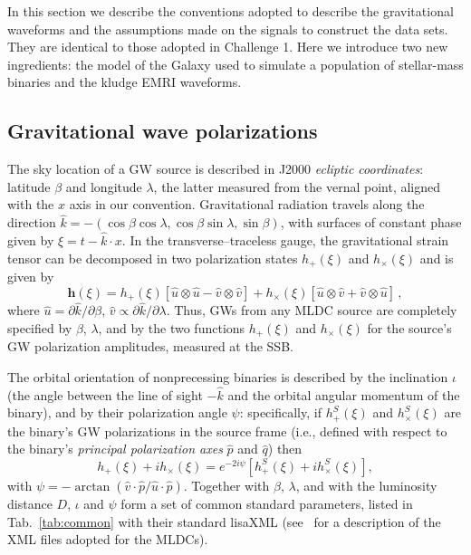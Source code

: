 \documentclass[12pt]{iopart}
\begin{document}
In this section we describe the conventions adopted to describe the gravitational waveforms and the assumptions made on the signals to construct the data sets. They are identical to those adopted in Challenge 1. Here we introduce two new ingredients: the model of the Galaxy used to simulate a population of stellar-mass binaries and the kludge EMRI waveforms.

\subsection{Gravitational wave polarizations}
\label{ss:polarizations}

The sky location of a GW source is described in J2000 \emph{ecliptic coordinates}: latitude $\beta$ and longitude $\lambda$, the latter measured from the vernal point, aligned with the $\hat{x}$ axis in our convention. Gravitational radiation travels along the direction $\hat{k} = -(\cos \beta \cos \lambda, \cos \beta \sin \lambda, \sin \beta)$, with surfaces of constant phase given by $\xi = t - \hat{k} \cdot x$. In the transverse--traceless gauge, the gravitational strain tensor can be decomposed in two polarization states $h_{+}(\xi)$ and $h_{\times}(\xi)$ and is given by
%
\begin{equation}
\label{eq:defpol}
\mathbf{h}(\xi) = h_{+}(\xi) \left[ \hat{u}\otimes \hat{u} - \hat{v}\otimes \hat{v} \right] + h_{\times}(\xi) \left[ \hat{u}\otimes \hat{v} + \hat{v}\otimes \hat{u} \right]\,,
\end{equation}
%
where $\hat{u} = \partial \hat{k} / \partial{\beta}$, $\hat{v} \propto \partial \hat{k} / \partial{\lambda}$. Thus, GWs from any MLDC source are completely specified by $\beta$, $\lambda$, and by the two functions $h_+(\xi)$ and $h_\times(\xi)$ for the source's GW polarization amplitudes, measured at the SSB.

The orbital orientation of nonprecessing binaries is described by the inclination $\iota$ (the angle between the line of sight $-\hat{k}$ and the orbital angular momentum of the binary), and by their polarization angle $\psi$: specifically, if $h^S_{+}(\xi)$ and $h^S_\times(\xi)$ are the binary's GW polarizations in the source frame (i.e., defined with respect to the binary's \emph{principal polarization axes} $\hat{p}$ and $\hat{q}$) then 
%
\begin{equation}
h_+(\xi) + i h_\times(\xi) = e^{-2 i \psi} \left[ h^S_+(\xi) + i h^S_\times(\xi) \right],
\end{equation}
%
with $\psi = -\arctan(\hat{v} \cdot \hat{p} / \hat{u} \cdot \hat{p})$.
Together with $\beta$, $\lambda$, and with the luminosity distance $D$, $\iota$ and $\psi$ form a set of common standard parameters, listed in Tab.\ \ref{tab:common} with their standard lisaXML (see~\cite{} for a description of the XML files adopted for the MLDCs).
\end{document}
